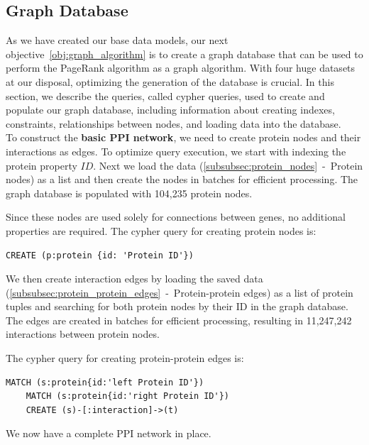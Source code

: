 \subsection{Graph Database} \label{subsec:graph_database}

As we have created our base data models, our next objective~\ref{obj:graph_algorithm} is to create a graph database
that can be used to perform the PageRank algorithm as a graph algorithm.
With four huge datasets at our disposal, optimizing the generation of the database is crucial.
In this section, we describe the queries, called cypher queries, used to create and populate our graph database,
including information about creating indexes, constraints, relationships between nodes, and loading data into the database.\\


To construct the \textbf{basic PPI network}, we need to create protein nodes and their interactions as edges.
To optimize query execution, we start with indexing the protein property $ID$.
Next we load the data (\ref{subsubsec:protein_nodes}~-~Protein nodes) as a list and then create the nodes in batches for efficient processing.
The graph database is populated with 104,235 protein nodes.

Since these nodes are used solely for connections between genes, no additional properties are required.
The cypher query for creating protein nodes is:
\begin{lstlisting}[language=Cypher, label={lst:protein_nodes}]
    CREATE (p:protein {id: 'Protein ID'})
\end{lstlisting}
\vspace{\baselineskip}

We then create interaction edges by loading the saved data (\ref{subsubsec:protein_protein_edges}~-~Protein-protein edges)
as a list of protein tuples and searching for both protein nodes by their ID in the graph database.
The edges are created in batches for efficient processing, resulting in 11,247,242 interactions between protein nodes.

The cypher query for creating protein-protein edges is:
\begin{lstlisting}[language=Cypher, label={lst:protein_edges}]
    MATCH (s:protein{id:'left Protein ID'})
    MATCH (s:protein{id:'right Protein ID'})
    CREATE (s)-[:interaction]->(t)
\end{lstlisting}

We now have a complete PPI network in place.\\

